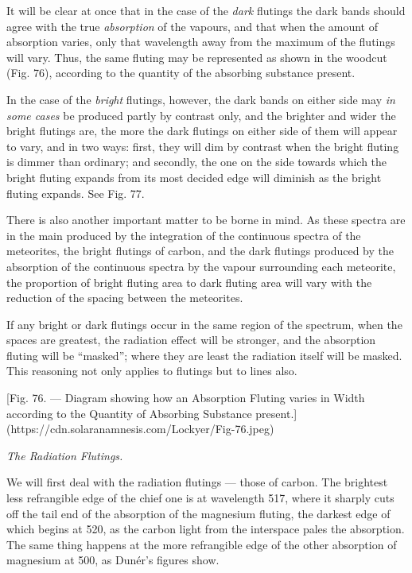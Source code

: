 \documentclass[a4paper, 12pt, oneside, polutonikogreek, english]{article}
\begin{document}
It will be clear at once that in the case of the \emph{dark} flutings the dark bands should agree with the true \emph{absorption} of the vapours, and that when the amount of absorption varies, only that wavelength away from the maximum of the flutings will vary. Thus, the same fluting may be represented as shown in the woodcut (Fig. 76), according to the quantity of the absorbing substance present.

In the case of the \emph{bright} flutings, however, the dark bands on either side may \emph{in some cases} be produced partly by contrast only, and the brighter and wider the bright flutings are, the more the dark flutings on either side of them will appear to vary, and in two ways: first, they will dim by contrast when the bright fluting is dimmer than ordinary; and secondly, the one on the side towards which the bright fluting expands from its most decided edge will diminish as the bright fluting expands. See Fig. 77.

There is also another important matter to be borne in mind. As these spectra are in the main produced by the integration of the continuous spectra of the meteorites, the bright flutings of carbon, and the dark flutings produced by the absorption of the continuous spectra by the vapour surrounding each meteorite, the proportion of bright fluting area to dark fluting area will vary with the reduction of the spacing between the meteorites.

If any bright or dark flutings occur in the same region of the spectrum, when the spaces are greatest, the radiation effect will be stronger, and the absorption fluting will be ``masked''; where they are least the radiation itself will be masked. This reasoning not only applies to flutings but to lines also.

[Fig. 76. --- Diagram showing how an Absorption Fluting varies in Width according to the Quantity of Absorbing Substance present.](https://cdn.solaranamnesis.com/Lockyer/Fig-76.jpeg)

\emph{The Radiation Flutings.}

We will first deal with the radiation flutings --- those of carbon. The brightest less refrangible edge of the chief one is at wavelength 517, where it sharply cuts off the tail end of the absorption of the magnesium fluting, the darkest edge of which begins at 520, as the carbon light from the interspace pales the absorption. The same thing happens at the more refrangible edge of the other absorption of magnesium at 500, as Dunér's figures show.
\end{document}

